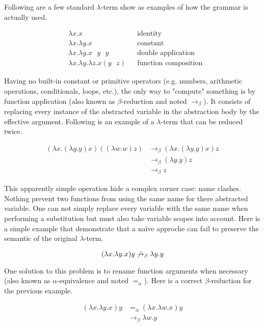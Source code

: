 \documentclass[a4paper, oneside, 12pt, titlepage]{article}
\begin{document}
Following are a few standard $\lambda$-term show as examples of how the grammar is actually used.

\begin{align*}
  & \lambda x. x && \text{identity} \\
  & \lambda x. \lambda y. x && \text{constant} \\
  & \lambda x. \lambda y. x \text{ } y \text{ } y && \text{double application} \\
  & \lambda x. \lambda y. \lambda z. x (y \text{ } z) && \text{function composition}
\end{align*}

Having no built-in constant or primitive operators (e.g. numbers, arithmetic operations,
conditionals, loops, etc.), the only way to "compute" something is by function application (also
known as $\beta$-reduction and noted $\to_\beta$). It consists of replacing every instance of the
abstracted variable in the abstraction body by the effective argument. Following is an example of a
$\lambda$-term that can be reduced twice.

\begin{align*}
  (\lambda x. (\lambda y. y) x) ((\lambda w. w) z)
    & \to_\beta (\lambda x. (\lambda y. y) x) z \\
    & \to_\beta (\lambda y. y) z \\
    & \to_\beta z
\end{align*}

This apparently simple operation hide a complex corner case: name clashes. Nothing prevent two
functions from using the same name for there abstracted variable. One can not simply replace every
variable with the same name when performing a substitution but must also take variable scopes into
account. Here is a simple example that demonstrate that a naïve approche can fail to preserve the
semantic of the original $\lambda$-term.

\begin{displaymath}
  (\lambda x. \lambda y. x) y \not\to_\beta \lambda y. y \\
\end{displaymath}

One solution to this problem is to rename function arguments when necessary (also known as
$\alpha$-equivalence and noted $=_\alpha$). Here is a correct $\beta$-reduction for the previous
example.

\begin{align*}
  (\lambda x. \lambda y. x) y
    & =_\alpha (\lambda x. \lambda w. x) y \\
    & \to_\beta \lambda w. y \\
\end{align*}
\end{document}
